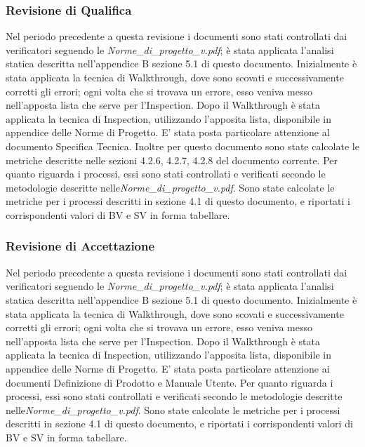 \subsubsection{Revisione di Qualifica}
Nel periodo precedente a questa revisione i documenti sono stati controllati dai verificatori seguendo le \emph{Norme\_di\_progetto\_v\versioneNormeDiProgetto{}.pdf}; è stata applicata l'analisi statica descritta nell'appendice B sezione 5.1 di questo documento. Inizialmente è stata applicata la tecnica di Walkthrough, dove sono scovati e successivamente corretti gli errori; ogni volta che si trovava un errore, esso veniva messo nell'apposta lista che serve per l'Inspection. Dopo il Walkthrough è stata applicata la tecnica di Inspection, utilizzando l'apposita lista, disponibile in appendice delle Norme di Progetto. E' stata posta particolare attenzione al documento Specifica Tecnica. Inoltre per questo documento sono state calcolate le metriche descritte nelle sezioni 4.2.6, 4.2.7, 4.2.8 del documento corrente. Per quanto riguarda i processi, essi sono stati controllati e verificati secondo le metodologie descritte nelle\emph{Norme\_di\_progetto\_v\versioneNormeDiProgetto{}.pdf}. Sono state calcolate le metriche per i processi descritti in
sezione 4.1 di questo documento, e riportati i corrispondenti valori di BV e SV in forma tabellare.
\subsubsection{Revisione di Accettazione}
Nel periodo precedente a questa revisione i documenti sono stati controllati dai verificatori seguendo le \emph{Norme\_di\_progetto\_v\versioneNormeDiProgetto{}.pdf}; è stata applicata l'analisi statica descritta nell'appendice B sezione 5.1 di questo documento. Inizialmente è stata applicata la tecnica di Walkthrough, dove sono scovati e successivamente corretti gli errori; ogni volta che si trovava un errore, esso veniva messo nell'apposta lista che serve per l'Inspection. Dopo il Walkthrough è stata applicata la tecnica di Inspection, utilizzando l'apposita lista, disponibile in appendice delle Norme di Progetto. E' stata posta particolare attenzione ai documenti Definizione di Prodotto e Manuale Utente. Per quanto riguarda i processi, essi sono stati controllati e verificati secondo le metodologie descritte nelle\emph{Norme\_di\_progetto\_v\versioneNormeDiProgetto{}.pdf}. Sono state calcolate le metriche per i processi descritti in sezione 4.1 di questo documento, e riportati i corrispondenti valori di BV e SV in forma tabellare.
